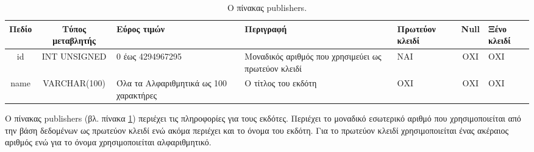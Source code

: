\documentclass{assignment}
\begin{document}
\begin{landscape}
\begin{table}[htbp]
\begin{center}
  \begin{tabular}{|c|c|m{}|m{}|m{2.0cm}|c|m{1.5cm}|}
    \hline
    {\bf Πεδίο} & {\bf Τύπος μεταβλητής} & {\bf Εύρος τιμών} & {\bf Περιγραφή} & {\bf Πρωτεύον κλειδί} & {\bf Null} & {\bf Ξένο κλειδί} \\ \hline
    id & INT UNSIGNED & 0 έως 4294967295 & Μοναδικός αριθμός που χρησιμεύει ως πρωτεύον κλειδί & ΝΑΙ & ΟΧΙ & ΟΧΙ \\ \hline
    name & VARCHAR(100) & Όλα τα Αλφαριθμητικά ως 100 χαρακτήρες & Ο τίτλος του εκδότη & ΟΧΙ & ΟΧΙ & ΟΧΙ \\ \hline
  \end{tabular}
\caption{Ο πίνακας publishers.}
\label{table:db_table:publishers}
\end{center}
\end{table}

Ο πίνακας publishers (βλ. πίνακα \ref{table:db_table:publishers}) περιέχει τις πληροφορίες για τους εκδότες. Περιέχει το μοναδικό εσωτερικό αριθμό που χρησιμοποιείται από την βάση δεδομένων ως πρωτεύον κλειδί ενώ ακόμα περιέχει και το όνομα του εκδότη. Για το πρωτεύον κλειδί χρησιμοποιείται ένας ακέραιος αριθμός ενώ για το όνομα χρησιμοποιείται αλφαριθμητικό.
\end{landscape}
\end{document}
